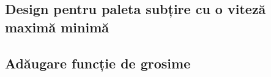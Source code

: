 \subsection{Design pentru paleta subțire cu o viteză maximă minimă}



\clearpage


\subsection{Adăugare funcție de grosime}



\clearpage